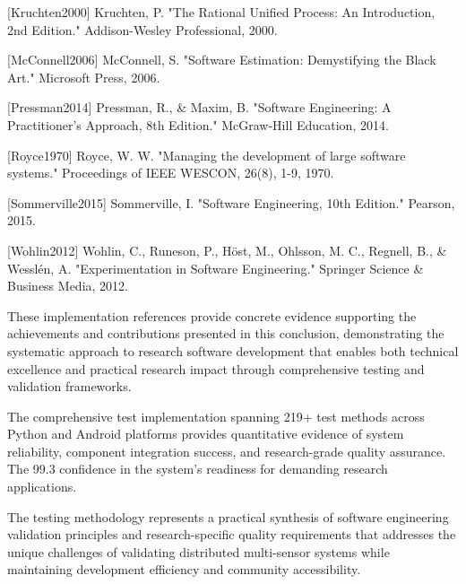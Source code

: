 \documentclass[11pt,a4paper]{article}
\begin{document}
[Kruchten2000] Kruchten, P. "The Rational Unified Process: An Introduction, 2nd Edition." Addison-Wesley Professional,
2000.

[McConnell2006] McConnell, S. "Software Estimation: Demystifying the Black Art." Microsoft Press, 2006.

[Pressman2014] Pressman, R., \& Maxim, B. "Software Engineering: A Practitioner's Approach, 8th Edition." McGraw-Hill
Education, 2014.

[Royce1970] Royce, W. W. "Managing the development of large software systems." Proceedings of IEEE WESCON, 26(8), 1-9,
1970.

[Sommerville2015] Sommerville, I. "Software Engineering, 10th Edition." Pearson, 2015.

[Wohlin2012] Wohlin, C., Runeson, P., Höst, M., Ohlsson, M. C., Regnell, B., \& Wesslén, A. "Experimentation in Software
Engineering." Springer Science \& Business Media, 2012.

These implementation references provide concrete evidence supporting the achievements and contributions presented in
this conclusion, demonstrating the systematic approach to research software development that enables both technical
excellence and practical research impact through comprehensive testing and validation frameworks.

The comprehensive test implementation spanning 219+ test methods across Python and Android platforms provides
quantitative evidence of system reliability, component integration success, and research-grade quality assurance.
The 99.3%
confidence in the system's readiness for demanding research applications.

The testing methodology represents a practical synthesis of software engineering validation principles and
research-specific quality requirements that addresses the unique challenges of validating distributed multi-sensor
systems while maintaining development efficiency and community accessibility.
\end{document}
